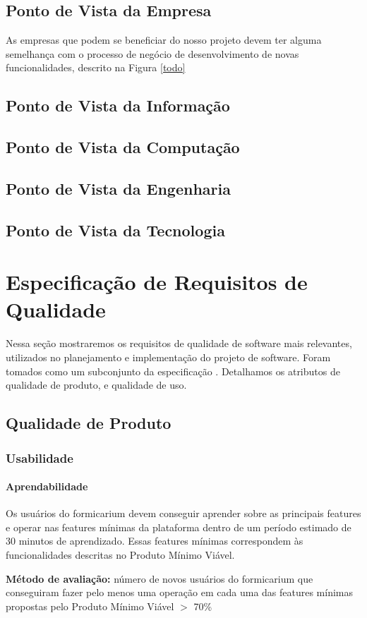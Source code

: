 \documentclass[twosideprint]{politex}
\begin{document}
	\section{Ponto de Vista da Empresa}
	    As empresas que podem se beneficiar do nosso projeto devem ter alguma semelhança com o processo de negócio de desenvolvimento de novas funcionalidades, descrito na Figura \ref{todo}
	\section{Ponto de Vista da Informação}
	\section{Ponto de Vista da Computação}
	\section{Ponto de Vista da Engenharia}
	\section{Ponto de Vista da Tecnologia}

\chapter{Especificação de Requisitos de Qualidade}
Nessa seção mostraremos os requisitos de qualidade de software mais relevantes, utilizados no planejamento e implementação do projeto de software. Foram tomados como um subconjunto da especificação \cite{softquality}. Detalhamos os atributos de qualidade de produto, e qualidade de uso. 
\section{Qualidade de Produto}
   \subsection{Usabilidade}
         \subsubsection {Aprendabilidade}
          Os usuários do formicarium devem conseguir aprender sobre as principais features e operar nas features mínimas da plataforma dentro de um período estimado de 30 minutos de aprendizado. Essas features mínimas correspondem às funcionalidades descritas no Produto Mínimo Viável.\par
          \textbf{Método de avaliação:}
          número de novos usuários do formicarium que conseguiram fazer pelo menos uma operação em cada uma das features mínimas propostas pelo Produto Mínimo Viável $>$ 70\%
\end{document}
